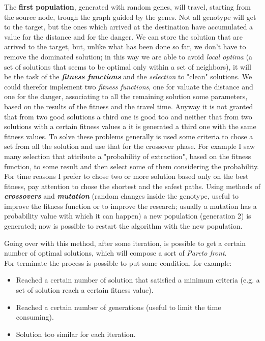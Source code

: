 \documentclass[a4paper,11pt]{report}
\begin{document}
The \textbf{first population}, generated with random genes, will travel, starting from the source node, trough the graph guided by the genes. Not all genotype will get to the target, but the ones which arrived at the destination have accumulated a value for the distance and for the danger.
We can store the solution that are arrived to the target, but, unlike what has been done so far, we don't have to remove the dominated solution; in this way we are able to avoid \textit{local optima} (a set of solutions that seems to be optimal only within a set of neighbors), it will be the task of the \textit{\textbf{fitness functions}} and the \textit{selection} to "clean" solutions. 
We could therefor implement two \textit{fitness functions}, one for valuate the distance and one for the danger, associating to all the remaining solution some parameters, based on the results of the fitness and the travel time.
Anyway it is not granted that from two good solutions a third one is good too and neither that from two solutions with a certain fitness values a it is generated a third one with the same fitness values. To solve these problems generally is used some criteria to chose a set from all the solution and use that for the crossover phase.
For example I saw many selection that attribute a "probability of extraction", based on the fitness function, to some result and then select some of them considering the probability.
For time reasons I prefer to chose two or more solution based only on the best fitness, pay attention to chose the shortest and the safest paths.
Using methods of \textbf{\textit{crossovers}} and \textbf{\textit{mutation}} (random changes inside the genotype, useful to improve the fitness function or to improve the research; usually a mutation has a probability value with which it can happen) a new population (generation 2) is generated; now is possible to restart the algorithm with the new population. 

Going over with this method, after some iteration, is possible to get a certain number of optimal solutions, which will compose a sort of \textit{Pareto front}.\\
For terminate the process is possible to put some condition, for example:
\begin{itemize}
	\item Reached a certain number of solution that satisfied a minimum criteria (e.g. a set of solution reach a certain fitness value).
	\item Reached a certain number of generations (useful to limit the time consuming).
	\item  Solution too similar for each iteration.
\end{itemize}
\end{document}
